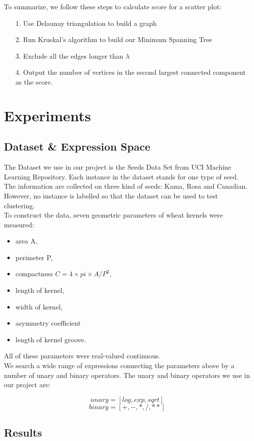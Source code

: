 \documentclass[fleqn]{SelfArx} %
\begin{document}
To summarize, we follow these steps to calculate score for a scatter plot:
\begin{itemize}
\item[1.] Use Delaunay triangulation to build a graph
\item[2.] Run Kruskal's algorithm to build our Minimum Spanning Tree
\item[3.] Exclude all the edges longer than $\lambda$
\item[4.] Output the number of vertices in the second largest connected component as the score.
\end{itemize}

\section{Experiments}

\subsection{Dataset \& Expression Space}
The Dataset we use in our project is the Seeds Data Set from UCI Machine Learning Repository. Each instance in the dataset stands for one type of seed. The information are collected on three kind of seeds: Kama, Rosa and Canadian. However, no instance is labelled so that the dataset can be used to test clustering.\\

To construct the data, seven geometric parameters of wheat kernels were measured: 
\begin{itemize}
\item area A, 
\item perimeter P, 
\item compactness $C = 4\times pi\times A/P^2$, 
\item length of kernel, 
\item width of kernel, 
\item asymmetry coefficient 
\item length of kernel groove. 
\end{itemize}
All of these parameters were real-valued continuous.\\

We search a wide range of expressions connecting the parameters above by a number of unary and binary operators. The unary and binary operators we use in our project are:

$$unary = [log, exp, sqrt]$$
$$binary = [+, -, *, /, **]$$

\subsection{Results}
\end{document}
